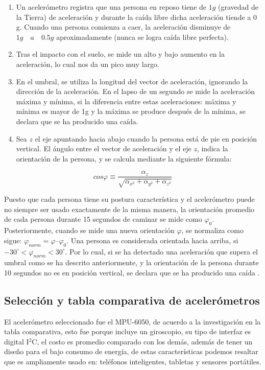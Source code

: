 \begin{enumerate}
	\item Un acelerómetro registra que una persona en reposo tiene de $1g$ (gravedad de la Tierra) de aceleración y durante la caída libre dicha aceleración tiende a 0 g. Cuando una persona comienza a caer, la aceleración disminuye de $1g \quad a \quad 0.5g$ aproximadamente (nunca se logra caída libre perfecta). 
	\item Tras el impacto con el suelo, se mide un alto y bajo aumento en la aceleración, lo cual nos da un pico muy largo.
	\item En el umbral, se utiliza la longitud del vector de aceleración, ignorando la dirección de la aceleración. En el lapso de un segundo se mide la aceleración máxima y mínima, si la diferencia entre estas aceleraciones: máxima y mínima es mayor de 1g y la máxima se produce después de la mínima, se declara que se ha producido una caída. 
	\item Sea $z$ el eje apuntando hacia abajo cuando la persona está de pie en posición vertical. El ángulo entre el vector de aceleración y el eje $z$, indica la orientación de la persona, y se calcula mediante la siguiente fórmula: 
\end{enumerate}

\begin{equation}
cos\varphi \equiv \frac{{\alpha}_{z}}{\sqrt{{{\alpha}_{x^2}+{\alpha}_{y^2}+{\alpha}_{z^2}}}}
\end{equation}

Puesto que cada persona tiene su postura característica y el acelerómetro puede no siempre ser usado exactamente de la misma manera, la orientación promedio de cada persona durante 15 segundos de caminar se mide como ${\varphi}_{0}$. Posteriormente, cuando se mide una nueva orientación $\varphi$, se normaliza como sigue: ${\varphi}_{norm} = \varphi – {\varphi}_{0}$. Una persona es considerada orientada hacia arriba, si $-30^{\circ} < {\varphi}_{norm} < 30^{\circ}$. Por lo cual, si se ha detectado una aceleración que supera el umbral como se ha descrito anteriormente, y la orientación de la persona durante 10 segundos no es en posición vertical, se declara que se ha producido una caída \cite{cincuenta}.

\subsection{Selección y tabla comparativa de acelerómetros}

El acelerómetro seleccionado fue el MPU-6050, de acuerdo a la investigación en la tabla comparativa, esto fue porque incluye un giroscopio, su tipo de interfaz es digital I$^{2}$C, el costo es promedio comparado con los demás, además de tener un diseño para el bajo consumo de energía, de estas características podemos resaltar que es ampliamente usado en: teléfonos inteligentes, tabletas y sensores portátiles. \\

